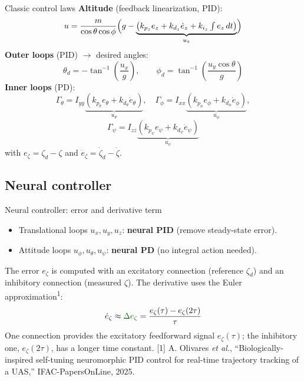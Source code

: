 \documentclass{beamer}
\newcommand{\slideref}[1]{\vfill{\tiny #1}}
\begin{document}
\begin{frame}{Classic control laws}
\small
\textbf{Altitude} (feedback linearization, PID):
\begin{equation*}
u= \frac{m}{\cos\theta \cos \phi}\Bigl( g - \underbrace{\bigl(k_{p_z} e_z+k_{d_z} \dot e_z +k_{i_z}\textstyle\int e_z\,dt\bigr)}_{u_z}\Bigr)
\end{equation*}
\textbf{Outer loops} (PID) $\rightarrow$ desired angles:
\begin{equation*}
\theta_d=-\tan^{-1}\!\left(\frac{u_x}{g}\right),\qquad
\phi_d=\tan^{-1}\!\left(\frac{u_y\cos\theta}{g}\right)
\end{equation*}
\textbf{Inner loops} (PD):
\begin{equation*}
\Gamma_\theta = I_{yy}\underbrace{(k_{p_\theta}e_\theta+k_{d_\theta}\dot e_\theta)}_{u_\theta},\quad
\Gamma_\phi = I_{xx}\underbrace{(k_{p_\phi}e_\phi+k_{d_\phi}\dot e_\phi)}_{u_\phi},
\end{equation*}
\vspace{-0.3cm}
\begin{equation*}
\Gamma_\psi = I_{zz}\underbrace{(k_{p_\psi}e_\psi+k_{d_\psi}\dot e_\psi)}_{u_\psi}
\end{equation*}
with $e_\zeta=\zeta_d-\zeta$ and $\dot e_\zeta=\dot\zeta_d-\dot\zeta$.
\end{frame}

\subsection{Neural controller}
\begin{frame}{Neural controller: error and derivative term}
\begin{itemize}
    \item Translational loops $u_x,u_y,u_z$: \textbf{neural PID} (remove steady-state error).
    \item Attitude loops $u_\phi,u_\theta,u_\psi$: \textbf{neural PD} (no integral action needed).
\end{itemize}
The error $e_\zeta$ is computed with an excitatory connection (reference $\zeta_d$) and an inhibitory connection (measured $\zeta$). The derivative uses the Euler approximation\textsuperscript{1}:
\begin{equation*}
\dot e_\zeta \approx \textcolor{darkgreen}{\Delta e_\zeta} = \frac{e_\zeta(\tau)-e_\zeta(2\tau)}{\tau}
\end{equation*}
One connection provides the excitatory feedforward signal $e_\zeta(\tau)$; the inhibitory one, $e_\zeta(2\tau)$, has a longer time constant.
\slideref{[1] A. Olivares \emph{et al.}, ``Biologically-inspired self-tuning neuromorphic PID control for real-time trajectory tracking of a UAS,'' IFAC-PapersOnLine, 2025.}
\end{frame}
\end{document}
